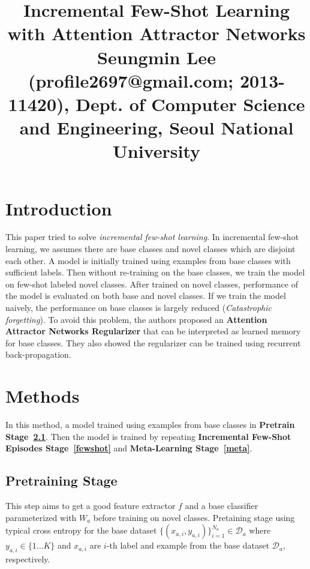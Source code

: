 \documentclass[10pt,twocolumn,letterpaper]{article}
\newcommand{\Da}{\mathcal{D}_a}
\begin{document}
\title{Incremental Few-Shot Learning with Attention Attractor Networks\\ {\rm {\normalsize Seungmin Lee (profile2697@gmail.com; 2013-11420), Dept. of Computer Science and Engineering, Seoul National University}}}   %

\maketitle
\thispagestyle{empty}

\section{Introduction}
This paper tried to solve \textit{incremental few-shot learning}. In incremental few-shot learning, we assumes there are base classes and novel classes which are disjoint each other. A model is initially trained using examples from base classes with sufficient labels. Then without re-training on the base classes, we train the model on few-shot labeled novel classes. After trained on novel classes, performance of the model is evaluated on both base and novel classes. If we train the model naively, the performance on base classes is largely reduced (\textit{Catastrophic forgetting}). To avoid this problem, the authors proposed an \textbf{Attention Attractor Networks Regularizer} that can be interpreted as learned memory for base classes. They also showed the regularizer can be trained using recurrent back-propagation.

\section{Methods}
In this method, a model trained using examples from base classes in \textbf{Pretrain Stage~\ref{pretrain}}. Then the model is trained by repeating \textbf{Incremental Few-Shot Episodes Stage~\ref{fewshot}} and \textbf{Meta-Learning Stage~\ref{meta}}.

\subsection{Pretraining Stage}\label{pretrain}

This step aims to get a good feature extractor $f$ and a base classifier parameterized with $W_a$ before training on novel classes. Pretaining stage using typical cross entropy for the base dataset $\{(x_{a,i},y_{a,i})\}_{i=1}^{N_a}\in\Da$ where $y_{a,i}\in\{1...K\}$ and $x_{a, i}$ are $i$-th label and example from the base dataset $\Da$, respectively.
\end{document}
